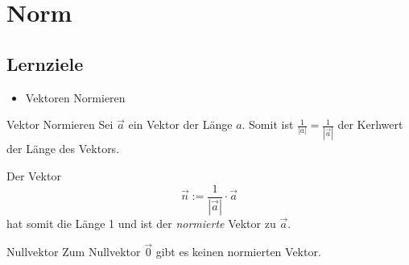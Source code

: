 \section{Norm}

\subsection*{Lernziele}
\begin{itemize}
\item Vektoren Normieren
\end{itemize}

\begin{gesetz}{Vektor Normieren}{}
  Sei $\vec{a}$ ein Vektor der Länge $a$.
  Somit ist $\frac1{|a|} = \frac1{|\vec{a}|}$ der Kerhwert der Länge
  des Vektors.

  Der Vektor $$\vec{n} := \frac1{|\vec{a}|}\cdot{}\vec{a}$$ hat somit
  die Länge 1 und ist der \textit{normierte} Vektor zu $\vec{a}$.
  \end{gesetz}

\begin{bemerkung}{Nullvektor}{}
  Zum Nullvektor $\vec{0}$ gibt es keinen normierten Vektor.
  \end{bemerkung}
